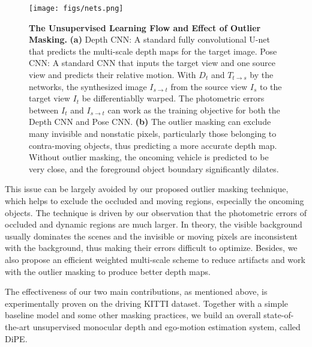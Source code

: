 \documentclass[letterpaper, 10 pt, conference]{ieeeconf}
\begin{document}
\begin{figure*}[t]
\begin{center}
\vspace{6pt}
\texttt{[image: figs/nets.png]}
\end{center}
\vspace{-12pt}
\caption{\textbf{The Unsupervised Learning Flow and Effect of Outlier Masking.} \textbf{(a)} {Depth CNN:} A standard fully convolutional U-net that predicts the multi-scale depth maps for the target image. {Pose CNN:} A standard CNN that inputs the target view and one source view and predicts their relative motion. With $D_t$ and $T_{t \to s}$ by the networks, the synthesized image $I_{s \to t}$ from the source view $I_s$ to the target view $I_t$ be differentiablly warped. The photometric errors between $I_t$ and $I_{s \to t}$ can work as the training objective for both the Depth CNN and Pose CNN. 
\textbf{(b)} The outlier masking can exclude many invisible and nonstatic pixels, particularly those belonging to contra-moving objects, thus predicting a more accurate depth map. Without outlier masking, the oncoming vehicle is predicted to be very close, and the foreground object boundary significantly dilates.}
\label{fig:framework}
\vspace{-10pt}
\end{figure*}


This issue can be largely avoided by our proposed {outlier masking} technique, which helps to exclude the occluded and moving regions, especially the oncoming objects. 
The technique is driven by our observation that the photometric errors of occluded and dynamic regions are much larger. 
In theory, the visible background usually dominates the scenes and the invisible or moving pixels are inconsistent with the background, thus making their errors difficult to optimize. 
Besides, we also propose an efficient weighted multi-scale scheme to reduce artifacts and work with the outlier masking to produce better depth maps. 

The effectiveness of our two main contributions, as mentioned above, is experimentally proven on the driving KITTI dataset.  Together with a simple baseline model and some other masking practices, we build an overall state-of-the-art unsupervised monocular depth and ego-motion estimation system, called DiPE.
\end{document}

